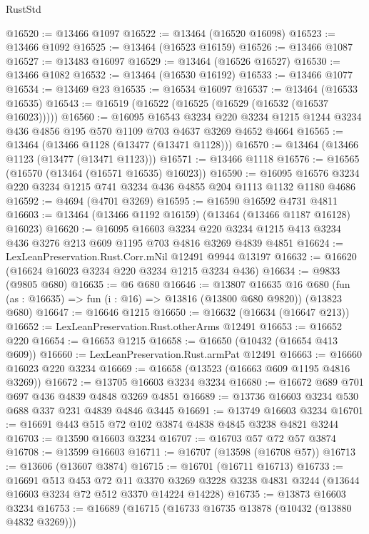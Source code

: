 \begin{lexlean}{RustStd}
\begin{coremodule}
@16520 := @13466 @1097
@16522 := @13464 (@16520 @16098)
@16523 := @13466 @1092
@16525 := @13464 (@16523 @16159)
@16526 := @13466 @1087
@16527 := @13483 @16097
@16529 := @13464 (@16526 @16527)
@16530 := @13466 @1082
@16532 := @13464 (@16530 @16192)
@16533 := @13466 @1077
@16534 := @13469 @23
@16535 := @16534 @16097
@16537 := @13464 (@16533 @16535)
@16543 := @16519 (@16522 (@16525 (@16529 (@16532 (@16537 @16023)))))
@16560 := @16095
    @16543
    @3234
    @220
    @3234
    @1215
    @1244
    @3234
    @436
    @4856
    @195
    @570
    @1109
    @703
    @4637
    @3269
    @4652
    @4664
@16565 := @13464 (@13466 @1128 (@13477 (@13471 @1128)))
@16570 := @13464 (@13466 @1123 (@13477 (@13471 @1123)))
@16571 := @13466 @1118
@16576 := @16565 (@16570 (@13464 (@16571 @16535) @16023))
@16590 := @16095 @16576 @3234 @220 @3234 @1215 @741 @3234 @436 @4855 @204 @1113 @1132 @1180 @4686
@16592 := @4694 (@4701 @3269)
@16595 := @16590 @16592 @4731 @4811
@16603 := @13464 (@13466 @1192 @16159) (@13464 (@13466 @1187 @16128) @16023)
@16620 := @16095
    @16603
    @3234
    @220
    @3234
    @1215
    @413
    @3234
    @436
    @3276
    @213
    @609
    @1195
    @703
    @4816
    @3269
    @4839
    @4851
@16624 := LexLeanPreservation.Rust.Corr.mNil @12491 @9944 @13197
@16632 := @16620 (@16624 @16023 @3234 @220 @3234 @1215 @3234 @436)
@16634 := @9833 (@9805 @680)
@16635 := @6 @680
@16646 := @13807
    @16635
    @16
    @680
    (fun (as : @16635) => fun (i : @16) => @13816 (@13800 @680 @9820))
    (@13823 @680)
@16647 := @16646 @1215
@16650 := @16632 (@16634 (@16647 @213))
@16652 := LexLeanPreservation.Rust.otherArms @12491
@16653 := @16652 @220
@16654 := @16653 @1215
@16658 := @16650 (@10432 (@16654 @413 @609))
@16660 := LexLeanPreservation.Rust.armPat @12491
@16663 := @16660 @16023 @220 @3234
@16669 := @16658 (@13523 (@16663 @609 @1195 @4816 @3269))
@16672 := @13705 @16603 @3234 @3234
@16680 := @16672 @689 @701 @697 @436 @4839 @4848 @3269 @4851
@16689 := @13736 @16603 @3234 @530 @688 @337 @231 @4839 @4846 @3445
@16691 := @13749 @16603 @3234
@16701 := @16691 @443 @515 @72 @102 @3874 @4838 @4845 @3238 @4821 @3244
@16703 := @13590 @16603 @3234
@16707 := @16703 @57 @72 @57 @3874
@16708 := @13599 @16603
@16711 := @16707 (@13598 (@16708 @57))
@16713 := @13606 (@13607 @3874)
@16715 := @16701 (@16711 @16713)
@16733 := @16691
    @513
    @453
    @72
    @11
    @3370
    @3269
    @3228
    @3238
    @4831
    @3244
    (@13644 @16603 @3234 @72 @512 @3370 @14224 @14228)
@16735 := @13873 @16603 @3234
@16753 := @16689
    (@16715
      (@16733 @16735 @13878 (@10432 (@13880 @4832 @3269)))

\end{coremodule}
\end{lexlean}
